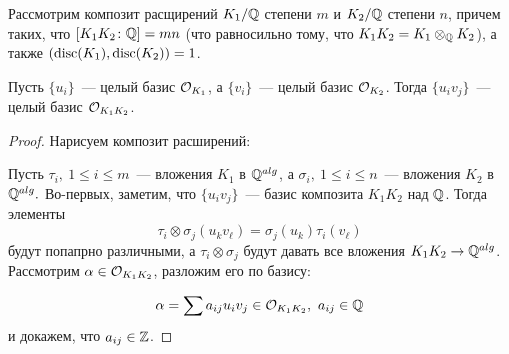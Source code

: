 	 \begin{theorem} 
	 	Рассмотрим композит расщирений $K_1/\mathbb{Q}$ степени $m$ и $K_2/\mathbb{Q}$ степени $n$, причем таких, что $[K_1 K_2 \colon \mathbb{Q}] = mn$ (что равносильно тому, что $K_1 K_2 = K_1 \otimes_{\mathbb{Q}} K_{2}$), а также $(\operatorname{disc}(K_1), \operatorname{disc}(K_2)) = 1$. 

	 	Пусть $\{u_i \}$~--- целый базис $\mathcal{O}_{K_1}$, а $\{ v_i \}$~--- целый базис $\mathcal{O}_{K_2}$. Тогда $\{ u_i v_j \}$~--- целый базис $\mathcal{O}_{K_1 K_2}$. 	
	 \end{theorem}
	 \begin{proof}
	 	Нарисуем композит расширений:
	 \begin{center}
	\end{center}

	Пусть $\tau_i, \ 1 \le i \le m$~--- вложения $K_1$  в $\mathbb{Q}^{alg}$, а $\sigma_i, \ 1 \le i \le n$~--- вложения $K_2$ в $\mathbb{Q}^{alg}. $ Во-первых, заметим, что $\{ u_i v_{j} \}$~--- базис композита $K_1 K_2$ над $\mathbb{Q}$. Тогда элементы 
	\[
		\tau_i \otimes \sigma_j  (u_k v_{\ell}) = \sigma_j(u_k) \tau_i(v_{\ell})
	\]
	будут попапрно различными, а $\tau_i \otimes \sigma_j$ будут давать все вложения $K_1 K_2 \to \mathbb{Q}^{alg}$. Рассмотрим $\alpha \in \mathcal{O}_{K_1 K_2}$, разложим его по базису:

	\[
		\alpha = \sum a_{i j} u_i v_j \in \mathcal{O}_{K_1 K_2}, \ a_{i j} \in \mathbb{Q}
	\]
	и докажем, что $a_{i j} \in \mathbb{Z}$. 


\end{proof}
